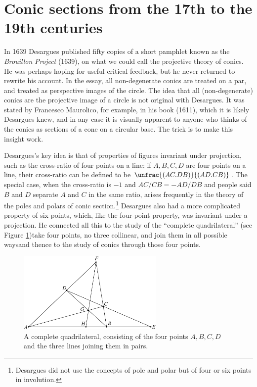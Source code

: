 \section{Conic sections from the 17th to the 19th centuries}
In 1639 Desargues published fifty copies of a short pamphlet known as
the \emph{Brouillon Project} (1639), on what we could call the
projective theory of conics. He was perhaps hoping for useful critical
feedback, but he never returned to rewrite his account.  In the essay,
all non-degenerate conics are treated on a par, and treated as
perspective images of the circle. The idea that all (non-degenerate)
conics are the projective image of a circle is not original with 
Desargues. It was stated by Francesco Maurolico, for example, in his
book  (1611), which it is likely Desargues knew, and in any case it is
visually apparent to anyone who thinks of the conics as sections of a
cone on a circular base. The trick is to make this insight work.

Desargues's key idea is that of properties of figures invariant under projection, such as the cross-ratio of four points on a line: if $A,  B, C, D$ are four points on a line, their cross-ratio can be defined to be
$\unfrac{(AC.DB)}{(AD.CB)}$. The special case,  when the cross-ratio
is $-1$ and $AC/CB=-AD/DB$ and people said $B$ and $D$ separate $A$
and $C$ in the same ratio, arises frequently in the theory of the
poles and polars of conic section.\footnote{Desargues did not use the
  concepts of pole and polar but of four or six points in involution.}
Desargues also had a more complicated property of six points, which,
like the four-point property, was invariant under a projection. He
connected all this to the study of the ``complete quadrilateral'' (see
Figure \ref{figCompleteQuad})\emdash take four points, no three
collinear, and join them in all possible ways\emdash  and thence to
the study of conics through those four points.  

\begin{figure}
\includegraphics[width=200pt]{main/CompleteQuad3} 
\caption{A complete quadrilateral, consisting of the four points $A, B, C, D$ and the three lines joining them in pairs.}
\label{figCompleteQuad}
\end{figure}


